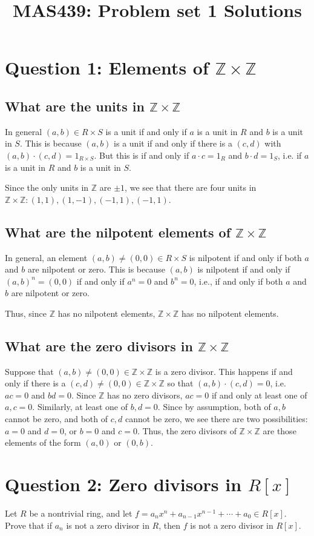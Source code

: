 \documentclass{amsart}
\title{MAS439: Problem set 1 Solutions}
\newcommand{\Z}{\mathbb{Z}}
\begin{document}
\section*{Question 1: Elements of $\Z\times\Z$}
\subsection*{What are the units in $\Z\times \Z$}  In general $(a,b)\in R\times S$ is a unit if and only if $a$ is a unit in $R$ and $b$ is a unit in $S$.  This is because $(a,b)$ is a unit if and only if there is a $(c,d)$ with $(a,b)\cdot (c,d)=1_{R\times S}$.  But this is if and only if $a\cdot c=1_R$ and $b\cdot d=1_S$, i.e. if $a$ is a unit in $R$ and $b$ is a unit in $S$.

Since the only units in $\Z$ are $\pm 1$, we see that there are four units in $\Z\times \Z: (1,1), (1,-1), (-1,1), (-1,1)$.

\subsection*{What are the nilpotent elements of $\Z\times \Z$} In general, an element $(a,b)\neq (0,0)\in R\times S$ is nilpotent if and only if both $a$ and $b$ are nilpotent or zero.  This is because $(a,b)$ is nilpotent if and only if $(a,b)^n=(0,0)$ if and only if $a^n=0$ and $b^n=0$, i.e., if and only if both $a$ and $b$ are nilpotent or zero.

Thus, since $\Z$ has no nilpotent elements, $\Z\times \Z$ has no nilpotent elements.

\subsection*{What are the zero divisors in $\Z\times\Z$} Suppose that $(a,b)\neq (0,0)\in\Z\times\Z$ is a zero divisor.  This happens if and only if there is a $(c,d)\neq (0,0)\in\Z\times\Z$ so that $(a,b)\cdot (c,d)=0$, i.e. $ac=0$ and $bd=0$.  Since $\Z$ has no zero divisors, $ac=0$ if and only at least one of $a,c=0$.  Similarly, at least one of $b,d=0$.  Since by assumption, both of $a,b$ cannot be zero, and both of $c,d$ cannot be zero, we see there are two possibilities: $a=0$ and $d=0$, or $b=0$ and $c=0$.  Thus, the zero divisors of $\Z\times\Z$ are those elements of the form $(a,0)$ or $(0,b)$.

\section*{Question 2: Zero divisors in $R[x]$}
Let $R$ be a nontrivial ring, and let $f=a_nx^n+a_{n-1}x^{n-1}+\cdots+a_0\in R[x]$.  Prove that if $a_n$ is not a zero divisor in $R$, then $f$ is not a zero divisor in $R[x]$.
\end{document}
